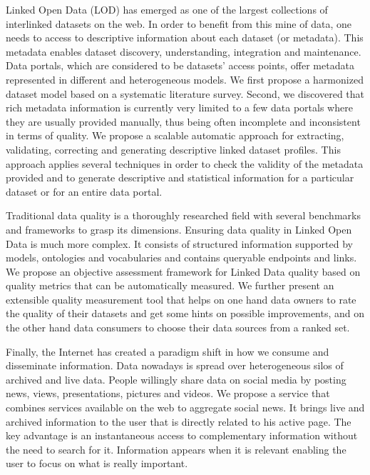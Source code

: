 Linked Open Data (LOD) has emerged as one of the largest collections of interlinked datasets on the web. In order to benefit from this mine of data, one needs to access to descriptive information about each dataset (or metadata). This metadata enables dataset discovery, understanding, integration and maintenance. Data portals, which are considered to be datasets' access points, offer metadata represented in different and heterogeneous models. We first propose a harmonized dataset model based on a systematic literature survey. Second, we discovered that rich metadata information is currently very limited to a few data portals where they are usually provided manually, thus being often incomplete and inconsistent in terms of quality. We propose a scalable automatic approach for extracting, validating, correcting and generating descriptive linked dataset profiles. This approach applies several techniques in order to check the validity of the metadata provided and to generate descriptive and statistical information for a particular dataset or for an entire data portal.

Traditional data quality is a thoroughly researched field with several benchmarks and frameworks to grasp its dimensions. Ensuring data quality in Linked Open Data is much more complex. It consists of structured information supported by models, ontologies and vocabularies and contains queryable endpoints and links. We propose an objective assessment framework for Linked Data quality based on quality metrics that can be automatically measured. We further present an extensible quality measurement tool that helps on one hand data owners to rate the quality of their datasets and get some hints on possible improvements, and on the other hand data consumers to choose their data sources from a ranked set.

Finally, the Internet has created a paradigm shift in how we consume and disseminate information. Data nowadays is spread over heterogeneous silos of archived and live data. People willingly share data on social media by posting news, views, presentations, pictures and videos. We propose a service that combines services available on the web to aggregate social news. It brings live and archived information to the user that is directly related to his active page. The key advantage is an instantaneous access to complementary information without the need to search for it. Information appears when it is relevant enabling the user to focus on what is really important.